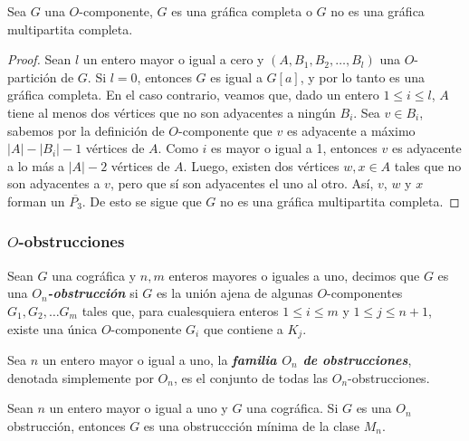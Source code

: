 \begin{lemma}
Sea $G$ una $O$-componente, $G$ es una gráfica completa o $G$ no es una gráfica multipartita completa.
\end{lemma}

\begin{proof}
Sean $l$ un entero mayor o igual a cero y $(A,B_1,B_2,\dots,B_l)$ una $O$-partición de $G$. Si $l=0$, entonces $G$ es igual a $G[a]$, y por lo tanto es una gráfica completa. En el caso contrario, veamos que, dado un entero $1\le i\le l$, $A$ tiene al menos dos vértices que no son adyacentes a ningún $B_i$. Sea $v\in B_i$, sabemos por la definición de $O$-componente que $v$ es adyacente a máximo $|A|-|B_i|-1$ vértices de $A$. Como $i$ es mayor o igual a 1, entonces $v$ es adyacente a lo más a $|A|-2$ vértices de $A$. Luego, existen dos vértices $w,x\in A$ tales que no son adyacentes a $v$, pero que sí son adyacentes el uno al otro. Así, $v$, $w$ y $x$ forman un $\overline{P_3}$. De esto se sigue que $G$ no es una gráfica multipartita completa.
\end{proof}

\subsubsection{$O$-obstrucciones}

Sean $G$ una cográfica y $n,m$ enteros mayores o iguales a uno, decimos que $G$ es una \emph{\textbf{$O_n$-obstrucción}} si $G$ es la unión ajena de algunas $O$-componentes $G_1,G_2,\dots G_m$ tales que, para cualesquiera enteros $1\le i \le m$ y $1\le j \le n+1$, existe una única $O$-componente $G_i$ que contiene a $K_j$. 

Sea $n$ un entero mayor o igual a uno, la \emph{\textbf{familia $O_n$ de obstrucciones}}, denotada simplemente por $O_n$, es el conjunto de todas las $O_n$-obstrucciones.

\begin{theorem}
Sean $n$ un entero mayor o igual a uno y $G$ una cográfica. Si $G$ es una $O_n$ obstrucción, entonces $G$ es una obstruccción mínima de la clase $M_n$.
\end{theorem}

